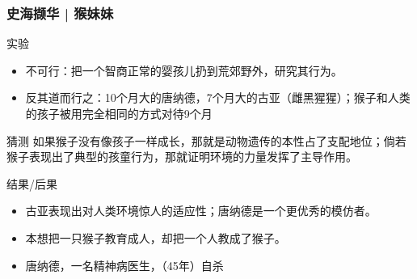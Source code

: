 \begin{frame}
  \frametitle{史海撷华 | 猴妹妹}
  \begin{block}{实验}
    \begin{itemize}
      \item 不可行：把一个智商正常的婴孩儿扔到荒郊野外，研究其行为。
      \item 反其道而行之：10个月大的唐纳德，7个月大的古亚（雌黑猩猩）；猴子和人类的孩子被用完全相同的方式对待9个月
    \end{itemize}
  \end{block}
  \vspace{-0.5em}
  \pause
  \begin{block}{猜测}
    如果猴子没有像孩子一样成长，那就是动物遗传的本性占了支配地位；倘若猴子表现出了典型的孩童行为，那就证明环境的力量发挥了主导作用。
  \end{block}
  \vspace{-0.5em}
  \pause
  \begin{block}{结果/后果}
    \begin{itemize}
      \item 古亚表现出对人类环境惊人的适应性；唐纳德是一个更优秀的模仿者。
      \item 本想把一只猴子教育成人，却把一个人教成了猴子。
      \item 唐纳德，一名精神病医生，（45年）自杀
    \end{itemize}
  \end{block}
\end{frame}

